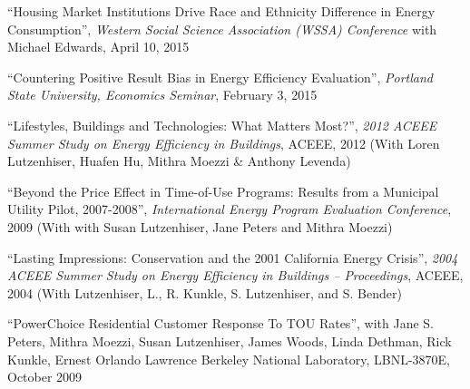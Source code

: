 \documentclass[Computer Science]{vita}
\begin{document}
\begin{vita}
\begin{Selected Publications}
\begin{Papers in Refereed Journals}

    \end{Papers in Refereed Journals}

    \begin{Papers at Refereed Conferences}
    
      \item ``Housing Market Institutions Drive Race and Ethnicity Difference in Energy Consumption'', \emph{Western Social Science Association (WSSA) Conference} with Michael Edwards, April 10, 2015
  
  \item ``Countering Positive Result Bias in Energy Efficiency Evaluation'', \emph{Portland State University, Economics Seminar}, February 3, 2015
  
    \item ``Lifestyles, Buildings and Technologies: What Matters Most?'', \emph{2012 ACEEE Summer Study
        on Energy Efficiency in Buildings}, ACEEE, 2012 (With Loren Lutzenhiser, Huafen Hu, Mithra Moezzi \& Anthony Levenda)

   \item ``Beyond the Price Effect in Time-of-Use Programs: Results
      from a Municipal Utility Pilot, 2007-2008'', \emph{International
        Energy Program Evaluation Conference}, 2009 (With with Susan
      Lutzenhiser, Jane Peters and Mithra Moezzi)

   \item ``Lasting Impressions: Conservation and the 2001 California
      Energy Crisis'', \emph{2004 ACEEE Summer Study on Energy
        Efficiency in Buildings -- Proceedings}, ACEEE, 2004 (With
      Lutzenhiser, L., R. Kunkle, S. Lutzenhiser, and S. Bender)

    
    
    \end{Papers at Refereed Conferences}
   
    \begin{Unrefereed Public Reports}
    
    \item ``PowerChoice Residential Customer Response To TOU Rates'',
      with Jane S. Peters, Mithra Moezzi, Susan Lutzenhiser, James
      Woods, Linda Dethman, Rick Kunkle, Ernest Orlando Lawrence
      Berkeley National Laboratory, LBNL-3870E, October 2009


\end{Unrefereed Public Reports}
\end{Selected Publications}
\end{vita}
\end{document}
